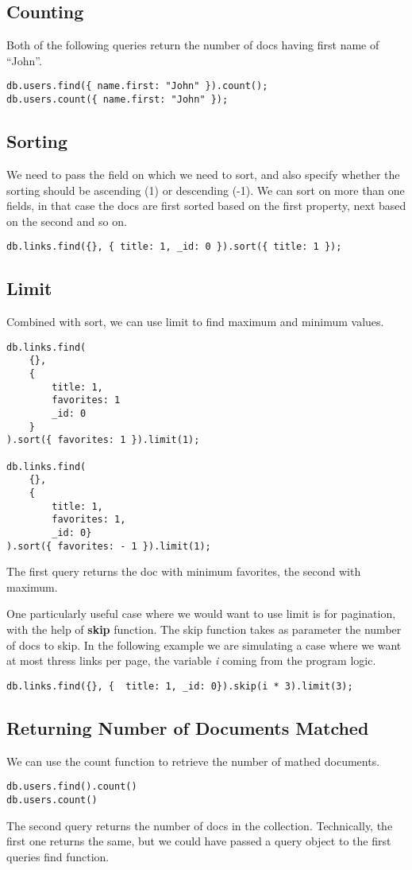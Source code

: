 \documentclass[a4paper, 12pt]{article}
\begin{document}
\subsection{Counting}
Both of the following queries return the number of docs having first name of ``John''.
\begin{verbatim}
db.users.find({ name.first: "John" }).count();
db.users.count({ name.first: "John" });
\end{verbatim}
\subsection{Sorting}
We need to pass the field on which we need to sort, and also specify whether the sorting should be ascending (1) or descending (-1). We can sort on more than one fields, in that case the docs are first sorted based on the first property, next based on the second and so on.
\begin{verbatim}
db.links.find({}, { title: 1, _id: 0 }).sort({ title: 1 });
\end{verbatim}
\subsection{Limit}
Combined with sort, we can use limit to find maximum and minimum values.
\begin{verbatim}
db.links.find(
    {},
    {
        title: 1,
        favorites: 1
        _id: 0
    }
).sort({ favorites: 1 }).limit(1);

db.links.find(
    {},
    {
        title: 1,
        favorites: 1,
        _id: 0}
).sort({ favorites: - 1 }).limit(1);
\end{verbatim}
The first query returns the doc with minimum favorites, the second with maximum.

One particularly useful case where we would want to use limit is for pagination, with the help of \textbf{skip} function. The skip function takes as parameter the number of docs to skip. In the following example we are simulating a case where we want at most thress links per page, the variable \emph{i} coming from the program logic.
\begin{verbatim}
db.links.find({}, {  title: 1, _id: 0}).skip(i * 3).limit(3);
\end{verbatim}
\subsection{Returning Number of Documents Matched}
We can use the count function to retrieve the number of mathed documents.
\begin{verbatim}
db.users.find().count()
db.users.count()
\end{verbatim}
The second query returns the number of docs in the collection. Technically, the first one returns the same, but we could have passed a query object to the first queries find function.
\end{document}
